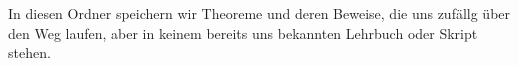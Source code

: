 In diesen Ordner speichern wir Theoreme und deren Beweise, die uns zufällg über den Weg laufen, aber in keinem bereits uns bekannten Lehrbuch oder Skript stehen.
